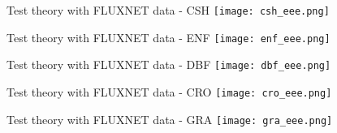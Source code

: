 \documentclass{beamer}
\begin{document}
    \begin{frame}{Test theory with FLUXNET data - CSH}
                \texttt{[image: csh\_eee.png]}
     \end{frame}


    \begin{frame}{Test theory with FLUXNET data - ENF}
                \texttt{[image: enf\_eee.png]}
     \end{frame}


    \begin{frame}{Test theory with FLUXNET data - DBF}
                \texttt{[image: dbf\_eee.png]}
     \end{frame}

    \begin{frame}{Test theory with FLUXNET data - CRO}
                \texttt{[image: cro\_eee.png]}
     \end{frame}

    \begin{frame}{Test theory with FLUXNET data - GRA}
                \texttt{[image: gra\_eee.png]}
     \end{frame}



\end{document}
